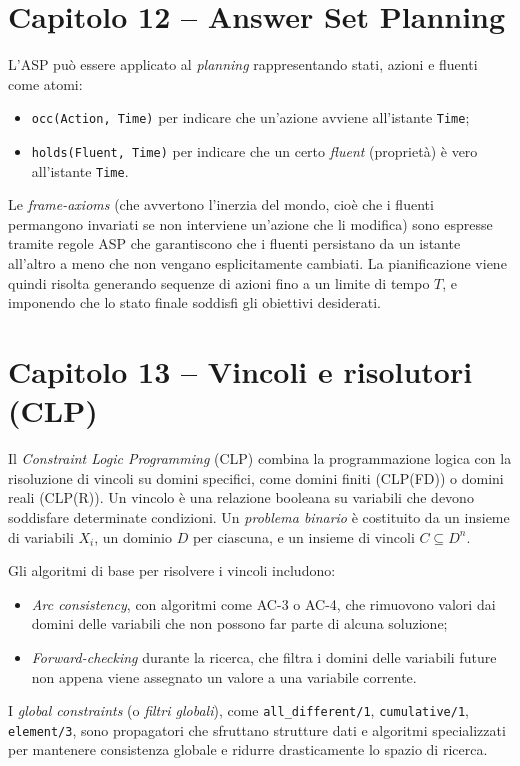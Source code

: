 \documentclass[12pt]{article}
\begin{document}
\section*{Capitolo 12 – Answer Set Planning}

L'ASP può essere applicato al \emph{planning} rappresentando stati, azioni e fluenti come atomi:
\begin{itemize}
  \item \texttt{occ(Action, Time)} per indicare che un'azione avviene all'istante \texttt{Time};
  \item \texttt{holds(Fluent, Time)} per indicare che un certo \emph{fluent} (proprietà) è vero all'istante \texttt{Time}.
\end{itemize}
Le \emph{frame-axioms} (che avvertono l'inerzia del mondo, cioè che i fluenti permangono invariati se non interviene un'azione che li modifica) sono espresse tramite regole ASP che garantiscono che i fluenti persistano da un istante all'altro a meno che non vengano esplicitamente cambiati. La pianificazione viene quindi risolta generando sequenze di azioni fino a un limite di tempo $T$, e imponendo che lo stato finale soddisfi gli obiettivi desiderati.

\section*{Capitolo 13 – Vincoli e risolutori (CLP)}

Il \emph{Constraint Logic Programming} (CLP) combina la programmazione logica con la risoluzione di vincoli su domini specifici, come domini finiti (CLP(FD)) o domini reali (CLP(R)). Un vincolo è una relazione booleana su variabili che devono soddisfare determinate condizioni. Un \emph{problema binario} è costituito da un insieme di variabili $X_i$, un dominio $D$ per ciascuna, e un insieme di vincoli $C \subseteq D^n$. 

Gli algoritmi di base per risolvere i vincoli includono:
\begin{itemize}
  \item \emph{Arc consistency}, con algoritmi come AC-3 o AC-4, che rimuovono valori dai domini delle variabili che non possono far parte di alcuna soluzione;
  \item \emph{Forward-checking} durante la ricerca, che filtra i domini delle variabili future non appena viene assegnato un valore a una variabile corrente.
\end{itemize}
I \emph{global constraints} (o \emph{filtri globali}), come \texttt{all\_different/1}, \texttt{cumulative/1}, \texttt{element/3}, sono propagatori che sfruttano strutture dati e algoritmi specializzati per mantenere consistenza globale e ridurre drasticamente lo spazio di ricerca.
\end{document}
